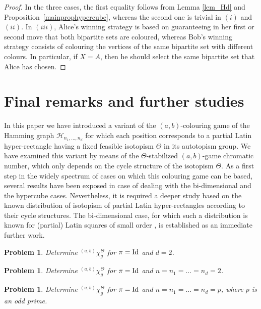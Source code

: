 \documentclass{article}
\newtheorem{prob}[thm]{Problem}
\begin{document}
\begin{proof}
In the three cases, the first equality follows from Lemma \ref{lem_Hd} and Proposition~\ref{mainprophypercube}, whereas the second one is trivial in $(i)$ and $(ii)$. In $(iii)$, Alice's winning strategy is based on guaranteeing in her first or second move that both bipartite sets are coloured, whereas Bob's winning strategy consists of colouring the vertices of the same bipartite set with different colours. In particular, if $X=A$, then he should select the same bipartite set that Alice has chosen.
\end{proof}

\section{Final remarks and further studies}

In this paper we have introduced a variant of the $(a,b)$-colouring game of the Hamming graph $\mathcal{H}_{n_1,\ldots,n_d}$ for which each position  corresponds to a partial Latin hyper-rectangle having a fixed feasible isotopism $\Theta$ in its autotopism group. We have examined this variant by means of the $\Theta$-stabilized $(a,b)$-game chromatic number, which only depends on the cycle structure of the isotopism $\Theta$. As a first step in the widely spectrum of cases on which this colouring game can be based, several results have been exposed in case of dealing with the bi-dimensional and the hypercube cases. Nevertheless, it is required a deeper study based on the known distribution of isotopism of partial Latin hyper-rectangles according to their cycle structures. The bi-dimensional case, for which such a distribution is known for (partial) Latin squares of small order \cite{Falcon2012, Falcon2013, Stones2012}, is established as an immediate further work.

\begin{prob}
Determine ${}^{(a,b)}\chi_g^{\Theta}$ for $\pi={\rm Id}$ and $d=2$.
\end{prob}

\begin{prob}
Determine ${}^{(a,b)}\chi_g^{\Theta}$ for $\pi={\rm Id}$ and $n=n_1=\ldots=n_d=2$.
\end{prob}

\begin{prob}
Determine ${}^{(a,b)}\chi_g^{\Theta}$ for $\pi={\rm Id}$ and $n=n_1=\ldots=n_d=p$, where $p$ is an odd prime.
\end{prob}
\end{document}
